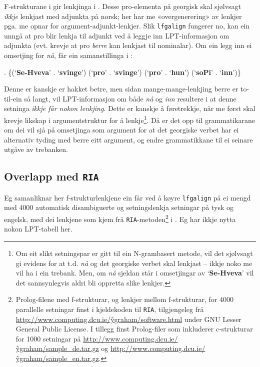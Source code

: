 \documentclass[11pt,a4paper,oneside,draft]{book}
\newcommand{\p}[1]{`\textbf{#1}'}
\begin{document}
F-strukturane i \LLast gir lenkjinga i \Last. Desse pro-elementa på
georgisk skal sjølvsagt \emph{ikkje} lenkjast med adjunkta på norsk; her
har me «overgenerering» av lenkjer pga. me opnar for
argument-adjunkt-lenkjer. Slik \texttt{lfgalign} fungerer no, kan ein unngå
at pro blir lenkja til adjunkt ved å leggje inn LPT-informasjon om
adjunkta (evt. krevje at pro \emph{berre} kan lenkjast til nominalar). Om
ein legg inn ei omsetjing for \emph{nå}, får ein samanstillinga i \Next:

\ex. \{(\p{Se-Hveva} . \p{svinge}) (\p{pro} . \p{svinge}) (\p{pro} . \p{hun}) (\p{soPi} . \p{inn})\}

Denne er kanskje er hakket betre, men sidan mange-mange-lenkjing berre
er to-til-ein så langt, vil LPT-informasjon om både \emph{nå} og \emph{inn}
resultere i at denne setninga \emph{ikkje får nokon lenkjing}. Dette er
kanskje å føretrekkje, når me først skal krevje likskap i
argumentstruktur for å lenkje\footnote{Om eit slikt setningspar er gitt til ein N-grambasert metode,
        vil det sjølvsagt gi evidens for at t.d. \emph{nå} og det georgiske
        verbet skal lenkjast -- ikkje noko me vil ha i ein
        trebank. Men, om \emph{nå} sjeldan står i omsetjingar av
        \p{Se-Hveva} vil det sannsynlegvis aldri bli oppretta slike
        lenkjer. }. Då er det opp til grammatikarane
om dei vil sjå på omsetjinga som argument for at det georgiske verbet
har ei alternativ tyding med berre eitt argument, og endre
grammatikkane til ei seinare utgåve av trebanken.

\subsection{Overlapp med \texttt{RIA}}
\label{sec-5.3.2}

\label{SEC:ria}

Eg samanliknar her f-strukturlenkjene ein får ved å køyre \texttt{lfgalign}
på ei mengd med 4000 automatisk disambiguerte og setningslenkja
setningar på tysk og engelsk, med dei lenkjene som kjem frå
\texttt{RIA}-metoden\footnote{Prolog-filene med f-strukturar, og lenkjer mellom
        f-strukturar, for 4000 parallelle setningar finst i
        kjeldekoden til \texttt{RIA}, tilgjengeleg frå
        \href{http://www.computing.dcu.ie/~ygraham/software.html}{http://www.computing.dcu.ie/\~ygraham/software.html} under GNU
        Lesser General Public License. I tillegg finst Prolog-filer
        som inkluderer c-strukturar for 1000 setningar på
        \href{http://www.computing.dcu.ie/~ygraham/sample_de.tar.gz}{http://www.computing.dcu.ie/\~ygraham/sample\_de.tar.gz} og
        \href{http://www.computing.dcu.ie/~ygraham/sample_en.tar.gz}{http://www.computing.dcu.ie/\~ygraham/sample\_en.tar.gz}. } i \citet{graham2009osr,graham2009fts}. Eg har
ikkje nytta nokon LPT-tabell her. 
\end{document}
